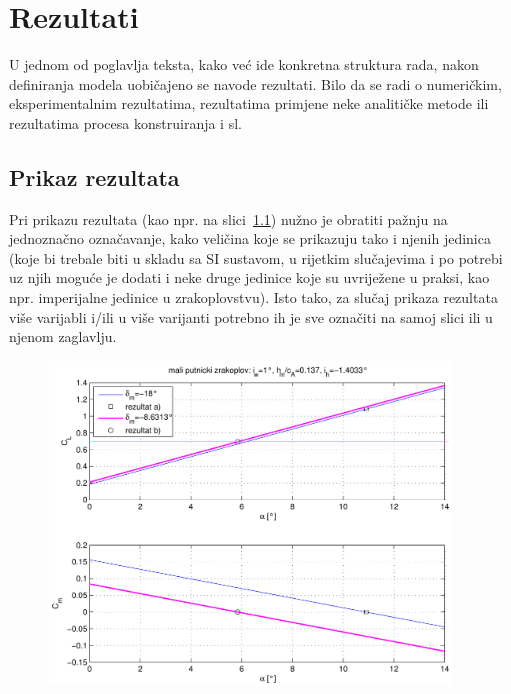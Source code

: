 \chapter{Rezultati}
U jednom od poglavlja teksta, kako već ide konkretna struktura rada, nakon definiranja
modela uobičajeno se navode rezultati. Bilo da se radi o numeričkim,
eksperimentalnim rezultatima, rezultatima primjene neke analitičke metode ili
rezultatima procesa konstruiranja i sl.

\section{Prikaz rezultata}
Pri prikazu rezultata (kao npr. na slici~\ref{fig:rez}) nužno je obratiti pažnju na
jednoznačno označavanje, kako veličina koje se prikazuju tako i njenih
jedinica (koje bi trebale biti u skladu sa SI sustavom, u rijetkim slučajevima
i po potrebi uz njih moguće je dodati i neke druge 
jedinice koje su uvriježene u praksi, kao npr. imperijalne jedinice u
zrakoplovstvu). Isto tako, za slučaj prikaza rezultata više varijabli
i/ili u više varijanti potrebno ih je sve označiti na samoj slici ili u njenom
zaglavlju. 
\begin{figure}
  \centering
  \includegraphics[width=0.95\textwidth]{rezultat}\\
  \label{fig:rez}
\end{figure}
%
%
